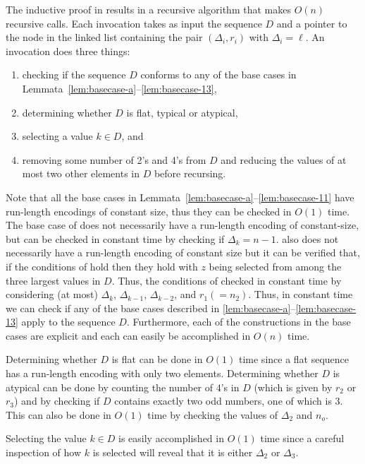 \documentclass[lotsofwhite,charterfonts]{patmorin}
\begin{document}
The inductive proof in  results in a recursive algorithm that
makes $O(n)$ recursive calls.  Each invocation takes as input the
sequence $D$ and a pointer to the node in the linked list containing the
pair $(\Delta_i,r_i)$ with $\Delta_i=\ell$.  An invocation does three things:
\begin{enumerate}
\item checking if the sequence $D$ conforms to any of the base cases
in Lemmata~\ref{lem:basecase-a}--\ref{lem:basecase-13},
\item determining whether $D$ is flat, typical or atypical,
\item selecting a value $k\in D$, and
\item removing some number of 2's and 4's from $D$ and reducing the values of 
       at most two other elements in $D$ before recursing.
\end{enumerate}

Note that all the base cases in
Lemmata~\ref{lem:basecase-a}--\ref{lem:basecase-11} have run-length
encodings of constant size, thus they can be checked in $O(1)$ time.
The base case of  does not necessarily have a
run-length encoding of constant-size, but can be checked in constant
time by checking if $\Delta_k = n-1$.   also does
not necessarily have a run-length encoding of constant size but it can
be verified that, if the conditions of  hold then
they hold with $z$ being selected from among the three largest values
in $D$.  Thus, the conditions of  checked in
constant time by considering (at most) $\Delta_k$, $\Delta_{k-1}$,
$\Delta_{k-2}$, and $r_1(=n_2)$.  Thus, in constant time we can check
if any of the base cases described in
\ref{lem:basecase-a}--\ref{lem:basecase-13} apply to the sequence $D$.
Furthermore, each of the constructions in the base cases are explicit
and each can easily be accomplished in $O(n)$ time.  

Determining whether $D$ is flat can be done in $O(1)$ time since a
flat sequence has a run-length encoding with only two elements.
Determining whether $D$ is atypical can be done by counting the number
of $4$'s in $D$ (which is given by $r_2$ or $r_3$) and by checking if
$D$ contains exactly two odd numbers, one of which is $3$.  This can
also be done in $O(1)$ time by checking the values of $\Delta_2$ and
$n_o$.

Selecting the value $k\in D$ is easily accomplished in $O(1)$ time
since a careful inspection of how $k$ is selected will reveal that it
is either $\Delta_2$ or $\Delta_3$.
\end{document}
